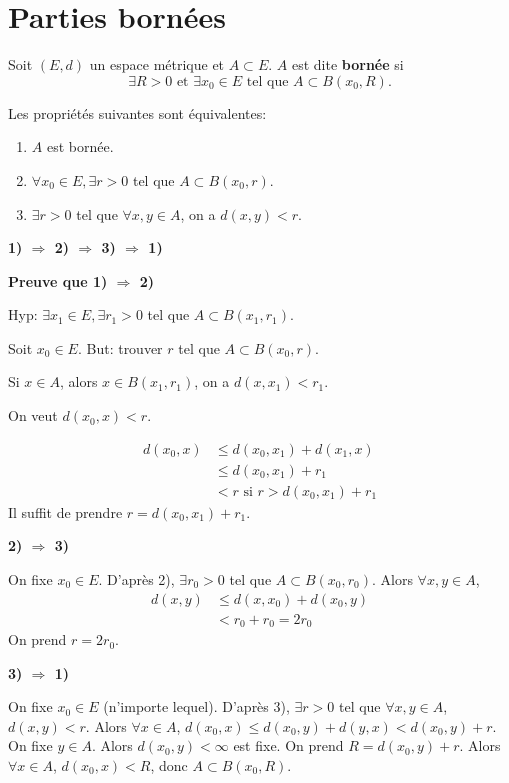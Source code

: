 \documentclass[oneside]{book}
\begin{document}
\section{Parties bornées}

\begin{definition}
Soit $(E, d)$ un espace métrique et $A \subset E$. $A$ est dite \textbf{bornée} si
\[
\exists R > 0 \text{ et } \exists x_0 \in E \text{ tel que } A \subset B(x_0, R).
\]
\end{definition}

\begin{lemma}
Les propriétés suivantes sont équivalentes:
\begin{enumerate}
    \item $A$ est bornée.
    \item $\forall x_0 \in E, \exists r > 0$ tel que $A \subset B(x_0, r)$.
    \item $\exists r > 0$ tel que $\forall x, y \in A$, on a $d(x, y) < r$.
\end{enumerate}
\end{lemma}

\begin{solution}
[Démonstration:]
\textbf{1) $\Rightarrow$ 2) $\Rightarrow$ 3) $\Rightarrow$ 1)}

\textbf{Preuve que 1) $\Rightarrow$ 2)}

Hyp: $\exists x_1 \in E, \exists r_1 > 0$ tel que $A \subset B(x_1, r_1)$.

Soit $x_0 \in E$. But: trouver $r$ tel que $A \subset B(x_0, r)$.

Si $x \in A$, alors $x \in B(x_1, r_1)$, on a $d(x, x_1) < r_1$.

On veut $d(x_0, x) < r$.

\begin{align*}
    d(x_0, x) &\leq d(x_0, x_1) + d(x_1, x) \\
              &\leq d(x_0, x_1) + r_1 \\
              &< r \text{ si } r > d(x_0, x_1) + r_1
\end{align*}
Il suffit de prendre $r = d(x_0, x_1) + r_1$.

\textbf{2) $\Rightarrow$ 3)}

On fixe $x_0 \in E$. D'après 2), $\exists r_0 > 0$ tel que $A \subset B(x_0, r_0)$.
Alors $\forall x, y \in A$,
\begin{align*}
    d(x, y) &\leq d(x, x_0) + d(x_0, y) \\
              &< r_0 + r_0 = 2r_0
\end{align*}
On prend $r = 2r_0$.

\textbf{3) $\Rightarrow$ 1)}

On fixe $x_0 \in E$ (n'importe lequel). D'après 3), $\exists r > 0$ tel que $\forall x, y \in A$, $d(x, y) < r$.
Alors $\forall x \in A$, $d(x_0, x) \leq d(x_0, y) + d(y, x) < d(x_0, y) + r$.
On fixe $y \in A$. Alors $d(x_0, y) < \infty$ est fixe. On prend $R = d(x_0, y) + r$.
Alors $\forall x \in A$, $d(x_0, x) < R$, donc $A \subset B(x_0, R)$.
\end{solution}
\end{document}
